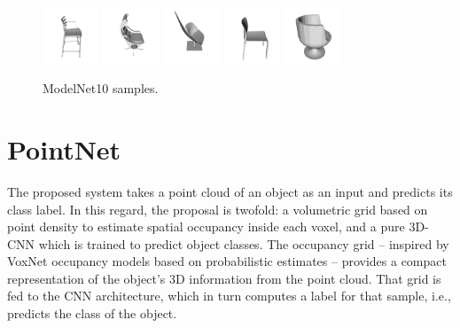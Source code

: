 \begin{figure}[!hbt]
	\includegraphics[width=0.15\textwidth]{Figures/ObjRecog/chair_0}\hfill
	\includegraphics[width=0.15\textwidth]{Figures/ObjRecog/chair_1}\hfill
	\includegraphics[width=0.15\textwidth]{Figures/ObjRecog/chair_2}\hfill
	\includegraphics[width=0.15\textwidth]{Figures/ObjRecog/chair_3}\hfill
	\includegraphics[width=0.15\textwidth]{Figures/ObjRecog/chair_4}\hfill
	\caption{ModelNet10 samples.}
	\label{fig:objrecog:modelnet_models}
\end{figure}

\section{PointNet}
\label{cha:objrecog:sec:pointnet}

The proposed system takes a point cloud of an object as an input and predicts its class label. In this regard, the proposal is twofold: a volumetric grid based on point density to estimate spatial occupancy inside each voxel, and a pure \ac{3D}-\ac{CNN} which is trained to predict object classes. The occupancy grid -- inspired by VoxNet \cite{Maturana2015} occupancy models based on probabilistic estimates -- provides a compact representation of the object's 3D information from the point cloud. That grid is fed to the \ac{CNN} architecture, which in turn computes a label for that sample, i.e., predicts the class of the object.

